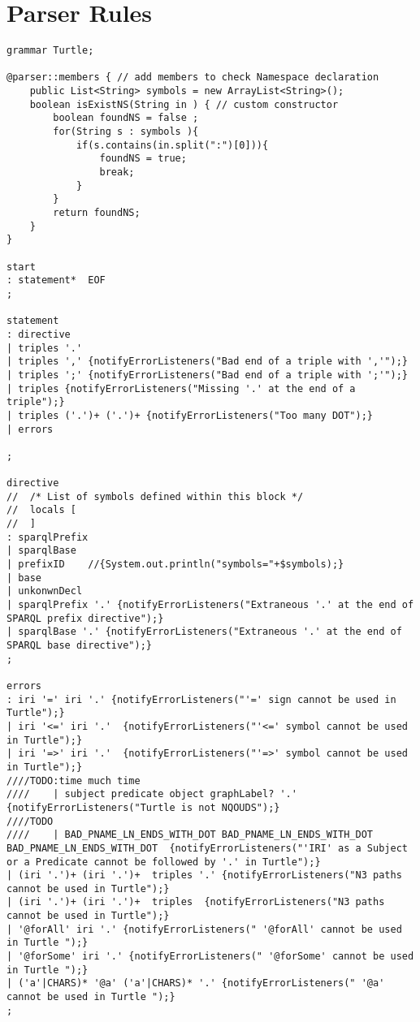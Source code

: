 \appendix

\chapter{Parser Rules}
\begin{lstlisting}[breaklines,basicstyle=\ttfamily]
grammar Turtle;

@parser::members { // add members to check Namespace declaration
	public List<String> symbols = new ArrayList<String>();
	boolean isExistNS(String in ) { // custom constructor
		boolean foundNS = false ; 
		for(String s : symbols ){
			if(s.contains(in.split(":")[0])){
				foundNS = true; 
				break;
			}
		}
		return foundNS;
	}
}

start
: statement*  EOF
;

statement
: directive
| triples '.'
| triples ',' {notifyErrorListeners("Bad end of a triple with ','");}
| triples ';' {notifyErrorListeners("Bad end of a triple with ';'");}
| triples {notifyErrorListeners("Missing '.' at the end of a triple");}
| triples ('.')+ ('.')+ {notifyErrorListeners("Too many DOT");}
| errors		

;

directive
//	/* List of symbols defined within this block */
//	locals [
//	]
: sparqlPrefix
| sparqlBase 
| prefixID    //{System.out.println("symbols="+$symbols);}
| base
| unkonwnDecl
| sparqlPrefix '.' {notifyErrorListeners("Extraneous '.' at the end of SPARQL prefix directive");}
| sparqlBase '.' {notifyErrorListeners("Extraneous '.' at the end of SPARQL base directive");}
;

errors	
: iri '=' iri '.' {notifyErrorListeners("'=' sign cannot be used in Turtle");}
| iri '<=' iri '.'  {notifyErrorListeners("'<=' symbol cannot be used in Turtle");}
| iri '=>' iri '.'  {notifyErrorListeners("'=>' symbol cannot be used in Turtle");}
////TODO:time much time
////    | subject predicate object graphLabel? '.' {notifyErrorListeners("Turtle is not NQOUDS");}
////TODO
//// 	| BAD_PNAME_LN_ENDS_WITH_DOT BAD_PNAME_LN_ENDS_WITH_DOT  BAD_PNAME_LN_ENDS_WITH_DOT  {notifyErrorListeners("'IRI' as a Subject or a Predicate cannot be followed by '.' in Turtle");}
| (iri '.')+ (iri '.')+  triples '.' {notifyErrorListeners("N3 paths cannot be used in Turtle");}
| (iri '.')+ (iri '.')+  triples  {notifyErrorListeners("N3 paths cannot be used in Turtle");}
| '@forAll' iri '.' {notifyErrorListeners(" '@forAll' cannot be used in Turtle ");}
| '@forSome' iri '.' {notifyErrorListeners(" '@forSome' cannot be used in Turtle ");}
| ('a'|CHARS)* '@a' ('a'|CHARS)* '.' {notifyErrorListeners(" '@a' cannot be used in Turtle ");}
;



\end{lstlisting}
